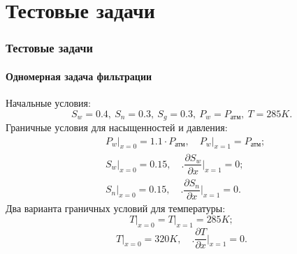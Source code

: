 \section{Тестовые задачи}

\begin{frame}
\begin{center}
\frametitle{Тестовые задачи}
\framesubtitle{Одномерная задача фильтрации}
Начальные условия:
\begin{equation*}
    S_w=0.4,\ S_n=0.3,\ S_g=0.3,\ P_w=P_\text{атм},\ T=285K.
\end{equation*}
Граничные условия для насыщенностей и давления:
\begin{equation*}
  \begin{aligned}
    &\left.P_w\right|_{x=0}=1.1\cdot P_{\text{атм}},\quad \left.{P_w}\right|_{x=1}=P_{\text{атм}};\\
    &\left.S_w\right|_{x=0}=0.15,\quad \Biggl.\dfrac{\partial{S_w}}{\partial{x}}\Biggr|_{x=1}=0;\\
    &\left.S_n\right|_{x=0}=0.15,\quad \Biggl.\dfrac{\partial{S_n}}{\partial{x}}\Biggr|_{x=1}=0.
  \end{aligned}
\end{equation*}
Два варианта граничных условий для температуры:
\begin{equation} \label{noT} \left.T\right|_{x=0}=\left.T\right|_{x=1}=285K; \end{equation}
\begin{equation} \label{T} \left.T\right|_{x=0}=320K,\quad \Biggl.\dfrac{\partial{T}}{\partial{x}}\Biggr|_{x=1}=0. \end{equation}
\end{center}
\end{frame}

